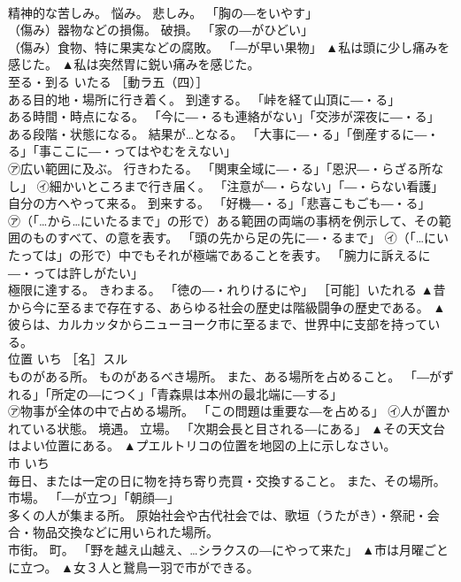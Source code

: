 \documentclass[8pt]{extreport}
\begin{document}
\begin{CJK}{UTF8}{min}
\\	精神的な苦しみ。 悩み。 悲しみ。 「胸の―をいやす」 
\\	（傷み）器物などの損傷。 破損。 「家の―がひどい」 
\\	（傷み）食物、特に果実などの腐敗。 「―が早い果物」	▲私は頭に少し痛みを感じた。 ▲私は突然胃に鋭い痛みを感じた。
\\	至る・到る	いたる	［動ラ五（四）］ 
\\	ある目的地・場所に行き着く。 到達する。 「峠を経て山頂に―・る」 
\\	ある時間・時点になる。 「今に―・るも連絡がない」「交渉が深夜に―・る」 
\\	ある段階・状態になる。 結果が…となる。 「大事に―・る」「倒産するに―・る」「事ここに―・ってはやむをえない」 
\\	㋐広い範囲に及ぶ。 行きわたる。 「関東全域に―・る」「恩沢―・らざる所なし」 ㋑細かいところまで行き届く。 「注意が―・らない」「―・らない看護」 
\\	自分の方へやって来る。 到来する。 「好機―・る」「悲喜こもごも―・る」 
\\	㋐（「…から…にいたるまで」の形で）ある範囲の両端の事柄を例示して、その範囲のものすべて、の意を表す。 「頭の先から足の先に―・るまで」 ㋑（「…にいたっては」の形で）中でもそれが極端であることを表す。 「腕力に訴えるに―・っては許しがたい」 
\\	極限に達する。 きわまる。 「徳の―・れりけるにや」 ［可能］いたれる	▲昔から今に至るまで存在する、あらゆる社会の歴史は階級闘争の歴史である。 ▲彼らは、カルカッタからニューヨーク市に至るまで、世界中に支部を持っている。
\\	位置	いち	［名］スル 
\\	ものがある所。 ものがあるべき場所。 また、ある場所を占めること。 「―がずれる」「所定の―につく」「青森県は本州の最北端に―する」 
\\	㋐物事が全体の中で占める場所。 「この問題は重要な―を占める」 ㋑人が置かれている状態。 境遇。 立場。 「次期会長と目される―にある」	▲その天文台はよい位置にある。 ▲プエルトリコの位置を地図の上に示しなさい。
\\	市	いち	
\\	毎日、または一定の日に物を持ち寄り売買・交換すること。 また、その場所。 市場。 「―が立つ」「朝顔―」 
\\	多くの人が集まる所。 原始社会や古代社会では、歌垣（うたがき）・祭祀・会合・物品交換などに用いられた場所。 
\\	市街。 町。 「野を越え山越え、…シラクスの―にやって来た」	▲市は月曜ごとに立つ。 ▲女３人と鵞鳥一羽で市ができる。

\end{CJK}
\end{document}
